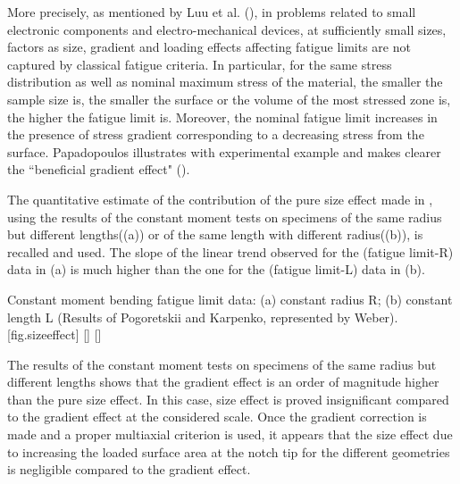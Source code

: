 More precisely, as mentioned by Luu et al. (\cite{luu2014formulation}), in problems related to small electronic components and electro-mechanical devices, at sufficiently small sizes, factors as size, gradient and loading effects affecting fatigue limits are not captured by classical fatigue criteria. In particular,  for the same stress distribution as well as nominal maximum stress of the material, the smaller the sample size is, the smaller the surface or the volume of the most stressed zone is, the higher the fatigue limit is.  Moreover, the nominal fatigue limit increases in the presence of stress gradient corresponding to a decreasing stress from the surface. Papadopoulos illustrates with experimental example and makes clearer the ``beneficial gradient effect" (\cite{Papadopoulos1996513}). 

The quantitative estimate of the contribution of the pure size effect made in \cite{Papadopoulos1996513}, using the results of the constant moment tests on specimens of the same radius but different lengths((a)) or of the same length with different radius((b)), is recalled and
used. The slope of the linear trend observed for the (fatigue limit-R)
data in (a) is much higher than the one for the (fatigue limit-L) data in (b).
\begin{Figure}[!h]{Constant moment bending fatigue limit data: (a) constant radius R; (b) constant length L (Results of Pogoretskii and Karpenko\cite{Pogoretskii1966}, represented by Weber\cite{weber1999fatigue}).}[fig.sizeeffect]
\end{Figure}

The results of the constant moment tests on specimens of the same radius but different lengths shows that the gradient effect is an order of magnitude higher than the pure size effect. In this case, size effect is proved insignificant compared to the gradient effect at the considered scale. Once the gradient correction is made and a proper multiaxial criterion is used, it appears that the size effect due to increasing the loaded surface area at the notch tip for the different geometries is negligible compared to the gradient effect.

